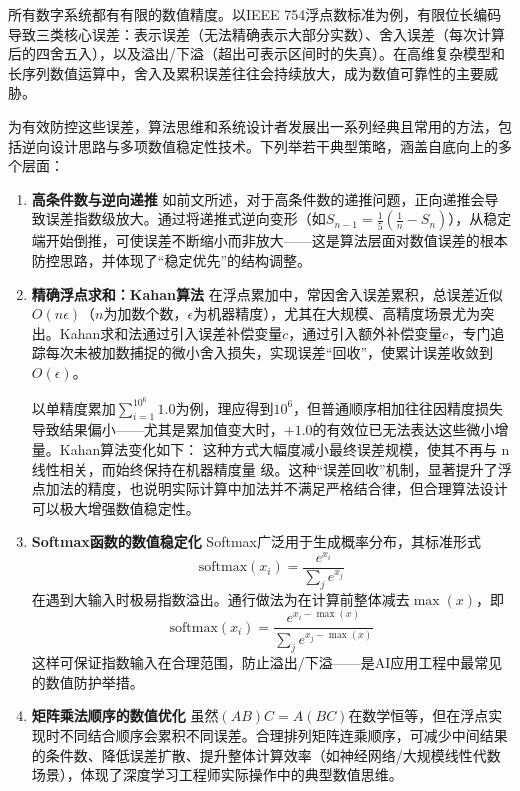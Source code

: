所有数字系统都有有限的数值精度。以IEEE 754浮点数标准为例，有限位长编码导致三类核心误差：表示误差（无法精确表示大部分实数）、舍入误差（每次计算后的四舍五入），以及溢出/下溢（超出可表示区间时的失真）。在高维复杂模型和长序列数值运算中，舍入及累积误差往往会持续放大，成为数值可靠性的主要威胁。

为有效防控这些误差，算法思维和系统设计者发展出一系列经典且常用的方法，包括逆向设计思路与多项数值稳定性技术。下列举若干典型策略，涵盖自底向上的多个层面：

\begin{enumerate}
    \item \textbf{高条件数与逆向递推}
    如前文所述，对于高条件数的递推问题，正向递推会导致误差指数级放大。通过将递推式逆向变形（如$S_{n-1} = \frac{1}{5}\left(\frac{1}{n} - S_n\right)$），从稳定端开始倒推，可使误差不断缩小而非放大——这是算法层面对数值误差的根本防控思路，并体现了“稳定优先”的结构调整。

    \item \textbf{精确浮点求和：Kahan算法}
    在浮点累加中，常因舍入误差累积，总误差近似~$O(n\epsilon)$（$n$为加数个数，$\epsilon$为机器精度），尤其在大规模、高精度场景尤为突出。Kahan求和法通过引入误差补偿变量$c$，通过引入额外补偿变量$c$，专门追踪每次未被加数捕捉的微小舍入损失，实现误差“回收”，使累计误差收敛到$O(\epsilon)$。

    以单精度累加$\sum_{i=1}^{10^6} 1.0$为例，理应得到$10^6$，但普通顺序相加往往因精度损失导致结果偏小——尤其是累加值变大时，$+1.0$的有效位已无法表达这些微小增量。Kahan算法变化如下：
    这种方式大幅度减小最终误差规模，使其不再与 n线性相关，而始终保持在机器精度量
    级。这种“误差回收”机制，显著提升了浮点加法的精度，也说明实际计算中加法并不满足严格结合律，但合理算法设计可以极大增强数值稳定性。

    \item \textbf{Softmax函数的数值稳定化}
    Softmax广泛用于生成概率分布，其标准形式
    $$\text{softmax}(x_i) = \frac{e^{x_i}}{\sum_j e^{x_j}}$$在遇到大输入时极易指数溢出。通行做法为在计算前整体减去$\max(x)$，即
    $$
    \text{softmax}(x_i) = \frac{e^{x_i - \max(x)}}{\sum_j e^{x_j - \max(x)}}
    $$
    这样可保证指数输入在合理范围，防止溢出/下溢——是AI应用工程中最常见的数值防护举措。

    \item \textbf{矩阵乘法顺序的数值优化}
    虽然$(AB)C = A(BC)$在数学恒等，但在浮点实现时不同结合顺序会累积不同误差。合理排列矩阵连乘顺序，可减少中间结果的条件数、降低误差扩散、提升整体计算效率（如神经网络/大规模线性代数场景），体现了深度学习工程师实际操作中的典型数值思维。
\end{enumerate}

